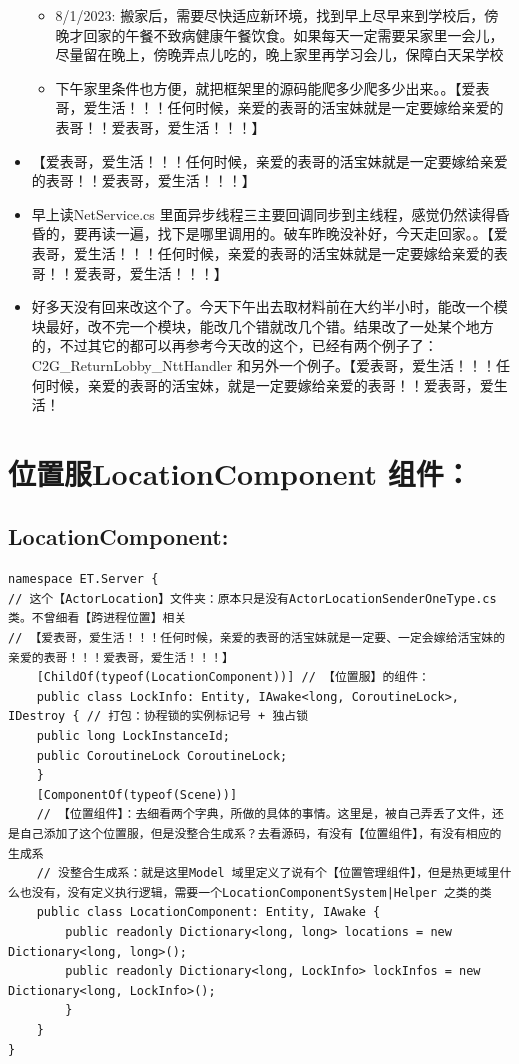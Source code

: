 \documentclass[9pt, b5paper]{article}
\begin{document}
\begin{itemize}
\begin{itemize}
\item 8/1/2023: 搬家后，需要尽快适应新环境，找到早上尽早来到学校后，傍晚才回家的午餐不致病健康午餐饮食。如果每天一定需要呆家里一会儿，尽量留在晚上，傍晚弄点儿吃的，晚上家里再学习会儿，保障白天呆学校
\item 下午家里条件也方便，就把框架里的源码能爬多少爬多少出来。。【爱表哥，爱生活！！！任何时候，亲爱的表哥的活宝妹就是一定要嫁给亲爱的表哥！！爱表哥，爱生活！！！】
\end{itemize}
\item 【爱表哥，爱生活！！！任何时候，亲爱的表哥的活宝妹就是一定要嫁给亲爱的表哥！！爱表哥，爱生活！！！】
\item 早上读NetService.cs 里面异步线程三主要回调同步到主线程，感觉仍然读得昏昏的，要再读一遍，找下是哪里调用的。破车昨晚没补好，今天走回家。。【爱表哥，爱生活！！！任何时候，亲爱的表哥的活宝妹就是一定要嫁给亲爱的表哥！！爱表哥，爱生活！！！】
\item 好多天没有回来改这个了。今天下午出去取材料前在大约半小时，能改一个模块最好，改不完一个模块，能改几个错就改几个错。结果改了一处某个地方的，不过其它的都可以再参考今天改的这个，已经有两个例子了：C2G\_ReturnLobby\_NttHandler 和另外一个例子。【爱表哥，爱生活！！！任何时候，亲爱的表哥的活宝妹，就是一定要嫁给亲爱的表哥！！爱表哥，爱生活！
\end{itemize}


\section{位置服LocationComponent 组件：}
\label{sec-5}
\subsection{LocationComponent:}
\label{sec-5-1}
\begin{verbatim}
namespace ET.Server {
// 这个【ActorLocation】文件夹：原本只是没有ActorLocationSenderOneType.cs 类。不曾细看【跨进程位置】相关
// 【爱表哥，爱生活！！！任何时候，亲爱的表哥的活宝妹就是一定要、一定会嫁给活宝妹的亲爱的表哥！！！爱表哥，爱生活！！！】
    [ChildOf(typeof(LocationComponent))] // 【位置服】的组件：
    public class LockInfo: Entity, IAwake<long, CoroutineLock>, IDestroy { // 打包：协程锁的实例标记号 + 独占锁
    public long LockInstanceId;
    public CoroutineLock CoroutineLock;
    }
    [ComponentOf(typeof(Scene))]
    // 【位置组件】：去细看两个字典，所做的具体的事情。这里是，被自己弄丢了文件，还是自己添加了这个位置服，但是没整合生成系？去看源码，有没有【位置组件】，有没有相应的生成系
    // 没整合生成系：就是这里Model 域里定义了说有个【位置管理组件】，但是热更域里什么也没有，没有定义执行逻辑，需要一个LocationComponentSystem|Helper 之类的类
    public class LocationComponent: Entity, IAwake { 
        public readonly Dictionary<long, long> locations = new Dictionary<long, long>();
        public readonly Dictionary<long, LockInfo> lockInfos = new Dictionary<long, LockInfo>();
        }
    }
}
\end{verbatim}
\end{document}
